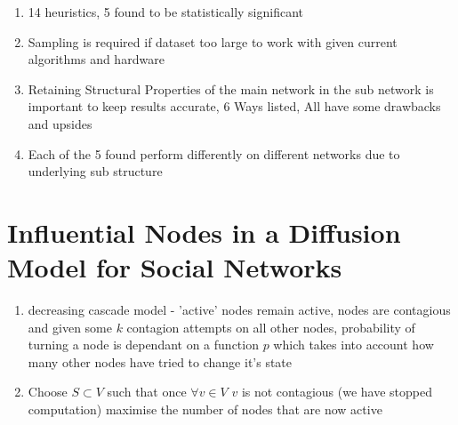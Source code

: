 \documentclass{article}
\begin{document}
\begin{enumerate}
  \item 14 heuristics, 5 found to be statistically significant
  \item Sampling is required if dataset too large to work with given current algorithms and hardware
  \item Retaining Structural Properties of the main network in the sub network is important to keep results accurate, 6 Ways listed, All have some drawbacks and upsides
  \item Each of the 5 found perform differently on different networks due to underlying sub structure
\end{enumerate}

\section{Influential Nodes in a Diffusion Model for Social
  Networks}
\cite{kempe2005influential}

\begin{enumerate}
  \item decreasing cascade model - 'active' nodes remain active, nodes are contagious and given some $k$ contagion attempts on all other nodes, probability of turning a node is dependant on a function $p$ which takes into account how many other nodes have tried to change it's state
  \item Choose $S \subset V$ such that once $\forall v \in V$ $v$ is not contagious (we have stopped computation) maximise the number of nodes that are now active
\end{enumerate}

{}

\end{document}
